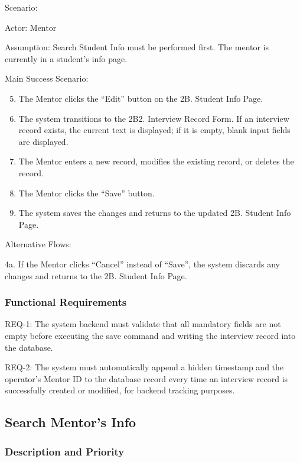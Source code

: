 Scenario:

Actor: Mentor

Assumption: Search Student Info must be performed first. The mentor is currently in a student's info page.

Main Success Scenario:
\begin{enumerate}
\setcounter{enumi}{4}
\item The Mentor clicks the ``Edit'' button on the 2B. Student Info Page.
\item The system transitions to the 2B2. Interview Record Form. If an interview record exists, the current text is displayed; if it is empty, blank input fields are displayed.
\item The Mentor enters a new record, modifies the existing record, or deletes the record.
\item The Mentor clicks the ``Save'' button.
\item The system saves the changes and returns to the updated 2B. Student Info Page.
\end{enumerate}

Alternative Flows:

4a. If the Mentor clicks ``Cancel'' instead of ``Save'', the system discards any changes and returns to the 2B. Student Info Page.

\subsubsection{Functional Requirements}

REQ-1: The system backend must validate that all mandatory fields are not empty before executing the save command and writing the interview record into the database.

REQ-2: The system must automatically append a hidden timestamp and the operator's Mentor ID to the database record every time an interview record is successfully created or modified, for backend tracking purposes.

\subsection{Search Mentor's Info}

\subsubsection{Description and Priority}

